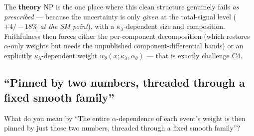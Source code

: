 \documentclass[11pt]{article}
\newcommand{\kl}{\ensuremath{\kappa_\lambda}}
\begin{document}
The \textbf{theory} NP is the one place where this clean structure genuinely fails \emph{as prescribed} ---
because the uncertainty is only \emph{given} at the total-signal level ($+4/{-}18\%$ \emph{at the SM point}),
with a \kl-dependent size and composition. Faithfulness then forces either the per-component decomposition
(which restores $\alpha$-only weights but needs the unpublished component-differential bands) or an explicitly
\kl-dependent weight $w_\theta(x;\kl,\alpha_\theta)$ --- that is exactly challenge C4.

\subsection{``Pinned by two numbers, threaded through a fixed smooth family''}\label{sec:pins}

\begin{qbox}[Question]
What do you mean by ``The entire $\alpha$-dependence of each event's weight is then pinned by just those two
numbers, threaded through a fixed smooth family''?
\end{qbox}
\end{document}
